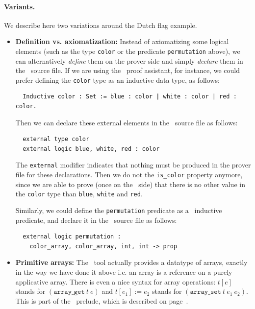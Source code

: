 \documentclass[a4paper,12pt]{report}
\makeatletter
\newcommand{\indextt}[1]{\index{#1@\texttt{#1}}}
\makeatother
\begin{document}
\paragraph{Variants.} We describe here two variations around the Dutch
flag example.
\begin{itemize}
\item\textbf{Definition vs. axiomatization:} \indextt{external}
  Instead of axiomatizing some logical elements (such as
  the type \texttt{color} or the predicate \texttt{permutation} above), we
  can alternatively \emph{define} them on the prover side and simply
  \emph{declare} them in the \why\ source file. If we are using the
  \coq\ proof assistant, for instance, we could prefer defining the
  \texttt{color} type as an inductive data type, as follows:
\begin{verbatim}
  Inductive color : Set := blue : color | white : color | red : color.
\end{verbatim}
  Then we can declare these external elements in the \why\ source file
  as follows:
\begin{verbatim}
  external type color
  external logic blue, white, red : color
\end{verbatim}
  The \texttt{external} modifier indicates that nothing must be
  produced in the prover file for these declarations. Then we do not
  the \texttt{is\_color} property anymore, since we are able to prove
  (once on the \coq\ side) that there is no other value in the
  \texttt{color} type than \texttt{blue}, \texttt{white} and \texttt{red}.

  Similarly, we could define the \texttt{permutation} predicate as a
  \coq\ inductive predicate, and declare it in the \why\ source file
  as follows:
\begin{verbatim}
  external logic permutation : 
    color_array, color_array, int, int -> prop
\end{verbatim}

\item\textbf{Primitive arrays:} 
  The \why\ tool actually provides a datatype of
  arrays, exactly in the way we have done it above i.e. an array is a
  reference on a purely applicative array.
  There is even a nice syntax for array operations:
  $t[e]$ stands for $(\mathtt{array\_get}~t~e)$
  and $t[e_1]:=e_2$ stands for $(\mathtt{array\_set}~t~e_1~e_2)$.
  This is part of the \why\ prelude, which is described on
  page~\pageref{prelude}. 

\end{itemize}
\end{document}
